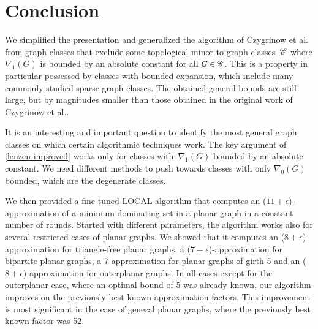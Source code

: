 
\section{Conclusion}

We simplified the presentation and generalized the algorithm of Czygrinow et al.~\cite{czygrinow2018distributed} from graph classes that exclude
some topological minor to graph classes~$\mathscr{C}$ where
$\nabla_1(G)$ is bounded
by an absolute constant for all $G\in \mathscr{C}$. This is a property
in particular possessed by classes with bounded expansion, which include
many commonly studied sparse graph classes. The obtained general  bounds are still large,
but by magnitudes smaller than those obtained in the original work of
Czygrinow et al.\cite{czygrinow2018distributed}.

It is an interesting and important question to identify the most
general graph classes on which certain algorithmic techniques work.
The key argument of \cref{lenzen-improved} works only for classes with~$\nabla_1(G)$ bounded by an absolute constant. We need different methods
to push towards classes with only $\nabla_0(G)$ bounded,
which are the degenerate classes.

 We then
provided a fine-tuned LOCAL algorithm that computes an
  ($11+\epsilon$)\hspace{1pt}-\hspace{1pt}approximation of
  a minimum dominating set in a planar graph in a constant number of
  rounds. Started with different parameters, the algorithm works also
  for several restricted cases of planar graphs. We showed that
  it computes an ($8+\epsilon$)\hspace{1pt}-\hspace{1pt}approximation for
  triangle-free planar graphs, a ($7+\epsilon$)\hspace{1pt}-\hspace{1pt}approximation
  for bipartite planar graphs, a 7\hspace{1pt}-\hspace{1pt}approximation
  for planar graphs of girth 5 and \linebreak an ($8+\epsilon$)\hspace{1pt}-\hspace{1pt}approximation
  for outerplanar graphs. In all cases except for the outerplanar case,
  where an optimal bound of 5 was already known, our algorithm
  improves on the previously best known approximation factors.
  This improvement is most significant in the case of general planar
  graphs, where the previously best known factor was 52.

